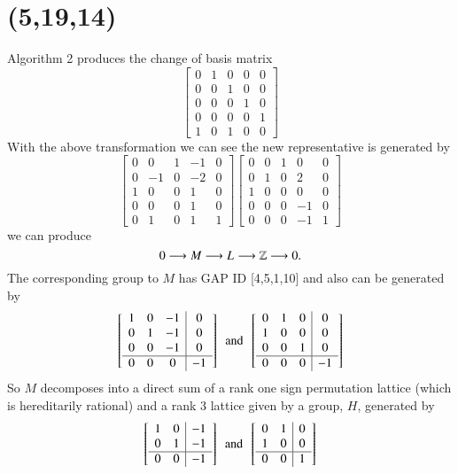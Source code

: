  \section{(5,19,14)}
Algorithm 2 produces the change of basis matrix 
$$
\left[ \begin {array}{ccccc} 0&1&0&0&0\\ 0&0&1&0&0
\\ 0&0&0&1&0\\ 0&0&0&0&1
\\ 1&0&1&0&0\end {array} \right] 
$$
With the above transformation we can see the new representative is generated by 
$$
 \left[ \begin {array}{cccc|c} 0&0&1&-1&0\\0&-1&0&-2
&0\\1&0&0&1&0\\0&0&0&1&0
\\ \hline 0&1&0&1&1\end {array} \right] 
 \left[ \begin {array}{cccc|c} 0&0&1&0&0\\0&1&0&2&0
\\1&0&0&0&0\\0&0&0&-1&0
\\\hline 0&0&0&-1&1\end {array} \right] 
$$
we can produce
$$
0 \longrightarrow M_{} \longrightarrow L_{} \longrightarrow \mathbb{Z} \longrightarrow 0
.$$
The corresponding group to $M$ has GAP ID [4,5,1,10] and also can be generated by
$$
 \left[ \begin {array}{ccc|c} 1&0&-1&0\\ 0&1&-1&0
\\ 0&0&-1&0\\ \hline 0&0&0&-1\end {array}
 \right] 
 \,\,\, \text{and} \,\,\,
 \left[ \begin {array}{ccc|c} 0&1&0&0\\ 1&0&0&0
\\ 0&0&1&0\\  \hline 0&0&0&-1\end {array}
 \right] 
$$
So $M$ decomposes into a direct sum of a rank one sign permutation lattice 
(which is hereditarily rational) and a rank 3 lattice given by a group, $H$, 
generated by
$$
\left[ \begin {array}{cc|c} 1&0&-1\\ 0&1&-1
\\ \hline 0&0&-1\end {array}
 \right] 
 \,\,\, \text{and} \,\,\,
 \left[ \begin {array}{cc|c} 0&1&0\\ 1&0&0
\\ \hline 0&0&1\end {array}
 \right] 
$$
